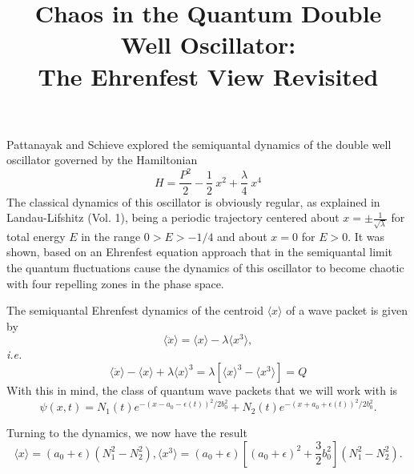 \documentclass [12pt,a4] {article}
\title{{\Large	\bf Chaos in the Quantum Double Well Oscillator:\\The Ehrenfest View Revisited}}
\begin{document}
	\maketitle
	Pattanayak and Schieve explored the semiquantal dynamics of the double well oscillator governed by the Hamiltonian
	\begin{equation}
	H = \frac{P^2} {2} - \frac{1} {2} \ x^2 + \frac{\lambda} {4} \ x^4
	\end{equation}
	The classical dynamics of this oscillator is obviously regular, as explained in Landau-Lifshitz (Vol. 1), being a periodic trajectory
	centered about $x = \pm \displaystyle\frac{1} {\sqrt{\lambda}}$ for total energy $E$ in the range  $0 > E > -1/4$ and about $x=0$ for $E>0$. It was shown, based on an Ehrenfest equation approach that in the semiquantal limit the quantum fluctuations cause the dynamics of this oscillator to become chaotic with four repelling zones in the phase space.  
	
	The semiquantal  Ehrenfest dynamics of the centroid $\langle x\rangle$ of a wave packet is given by
	\begin{equation}
	\langle \ddot x\rangle = \langle x\rangle - \lambda \langle x^3\rangle ,
	\end{equation}
	\textit{i.e.}
	\begin{equation}
	\langle\ddot x\rangle - \langle x\rangle + \lambda \langle x\rangle^3 
	= \lambda \left[\langle x\rangle^3 - \langle x^3\rangle\right] = Q
	\end{equation}
	With this in mind, the class of quantum wave packets that we
	will work with is
	\begin{equation}
	\psi (x,t) = N_1 (t) e^{- \left(x-a_0 - \epsilon (t)\right)^2/2 b^2_0} + 
	N_2 (t) e^{- \left(x+a_0 + \epsilon (t)\right)^2/2 b^2_0} .
	\end{equation}
	
	Turning to the dynamics, we now have the result
	\begin{subequations}
	\begin{equation}
	\langle x\rangle = (a_0 + \epsilon) (N_1^2 - N_2^2), 
	\end{equation}
	\begin{equation}
	\langle x^3\rangle = (a_0 + \epsilon) \left[(a_0 + \epsilon)^2 
	+ \frac{3} {2} b^2_0\right] (N_1^2 - N^2_2) .
	\end{equation}
	\end{subequations}
	
\end{document}
